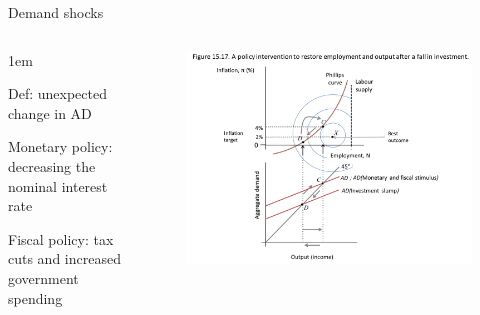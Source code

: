 \documentclass[11pt,aspectratio=43,usenames,dvipsnames]{beamer}
\let\olditemize=\itemize
\let\endolditemize=\enditemize
\renewenvironment{itemize}{\olditemize \itemsep1em}{\endolditemize}
\theoremstyle{definition}
\begin{document}
\begin{frame}{Demand shocks}
\label{slide:Demand_shocks}
    \begin{columns}
        \begin{column}{0.3\textwidth}
            \begin{itemize}
                \item Def: unexpected change in AD
                \item Monetary policy: decreasing the nominal interest rate
                \item Fiscal policy: tax cuts and increased government spending
            \end{itemize}

        \end{column}
        \begin{column}{0.7\textwidth}
            \begin{figure}
                \centering
                \includegraphics[width=\textwidth]{./figures/20.pdf}
            \end{figure}

        \end{column}
    \end{columns}
\end{frame}
\end{document}
